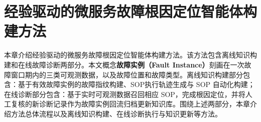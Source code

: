 
\chapter{经验驱动的微服务故障根因定位智能体构建方法}

本章介绍经验驱动的微服务故障根因定位智能体构建方法。该方法包含离线知识构建和在线故障诊断两部分。本文概念\textbf{故障实例（Fault Instance）}刻画在一次故障窗口期内的三类可观测数据，以及故障位置和故障类型。离线知识构建部分包含：基于有效故障实例的故障指纹构建、SOP执行轨迹生成与 SOP 自动化构建；在线诊断部分包含：基于实时可观测数据召回相应 SOP，完成根因定位，并将人工复核的新诊断记录作为故障实例回流归档更新知识库。围绕上述两部分，本章介绍方法总体流程以及离线知识构建、在线诊断执行与知识更新等方法。










